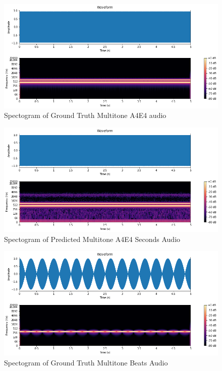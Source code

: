 \documentclass{ioereport}
\begin{document}
    \begin{figure}[H]
        \centering
        \includegraphics[width=\linewidth]{assets/audio_results/multitoneA4E4.png}
        \caption{Spectogram of Ground Truth Multitone A4E4 audio}
        \label{fig:gt-multiA4E4-spec}
    \end{figure}
    
    \begin{figure}[H]
        \centering
        \includegraphics[width=\linewidth]{assets/audio_results/multitoneA4E4pred.png}
        \caption{Spectogram of Predicted Multitone A4E4 Seconds Audio}
        \label{fig:pred-multiA4E4-spec}
    \end{figure}


    \begin{figure}[H]
        \centering
        \includegraphics[width=\linewidth]{assets/audio_results/multitoneBeats.png}
        \caption{Spectogram of Ground Truth Multitone Beats Audio}
        \label{fig:gt-multibeat-spec}
    \end{figure}
    
\end{document}
